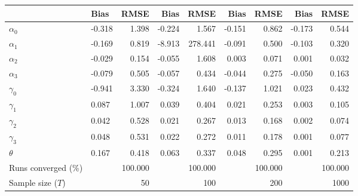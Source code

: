 
\begin{tabular}[t]{llrrrrrrr}
\toprule
  & Bias & RMSE & Bias & RMSE & Bias & RMSE & Bias & RMSE\\
\midrule
$\alpha_{0}$ & -0.318 & 1.398 & -0.224 & 1.567 & -0.151 & 0.862 & -0.173 & 0.544\\
$\alpha_{1}$ & -0.169 & 0.819 & -8.913 & 278.441 & -0.091 & 0.500 & -0.103 & 0.320\\
$\alpha_{2}$ & -0.029 & 0.154 & -0.055 & 1.608 & 0.003 & 0.071 & 0.001 & 0.032\\
$\alpha_{3}$ & -0.079 & 0.505 & -0.057 & 0.434 & -0.044 & 0.275 & -0.050 & 0.163\\
$\gamma_{0}$ & -0.941 & 3.330 & -0.324 & 1.640 & -0.137 & 1.021 & 0.023 & 0.432\\
$\gamma_{1}$ & 0.087 & 1.007 & 0.039 & 0.404 & 0.021 & 0.253 & 0.003 & 0.105\\
$\gamma_{2}$ & 0.042 & 0.528 & 0.021 & 0.267 & 0.013 & 0.168 & 0.002 & 0.074\\
$\gamma_{3}$ & 0.048 & 0.531 & 0.022 & 0.272 & 0.011 & 0.178 & 0.001 & 0.077\\
$\theta$ & 0.167 & 0.418 & 0.063 & 0.337 & 0.048 & 0.295 & 0.001 & 0.213\\
Runs converged (\%) &  & 100.000 &  & 100.000 &  & 100.000 &  & 100.000\\
Sample size ($T$) &  & 50 &  & 100 &  & 200 &  & 1000\\
\bottomrule
\end{tabular}
